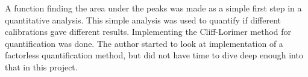 
A function finding the area under the peaks was made as a simple first step in a quantitative analysis.
This simple analysis was used to quantify if different calibrations gave different results.
Implementing the Cliff-Lorimer method for quantification was done. %
The author started to look at implementation of a factorless quantification method, but did not have time to dive deep enough into that in this project.



